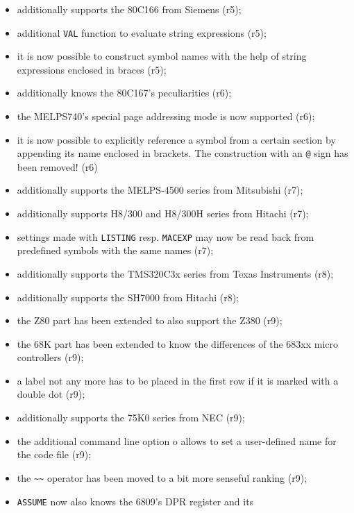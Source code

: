 \documentclass[12pt,twoside]{report}
\newcommand{\tty}[1]{{\tt #1}}
\begin{document}
\begin{itemize}
{\begin{itemize}
{            AS2MSG, replace it with the new version! (r5)}
      \item{additionally supports the 80C166 from Siemens (r5);}
      \item{additional \tty{VAL} function to evaluate string
            expressions (r5);}
      \item{it is now possible to construct symbol names with the
            help of string expressions enclosed in braces (r5);}
      \item{additionally knows the 80C167's peculiarities (r6);}
      \item{the MELPS740's special page addressing mode is now
            supported (r6);}
      \item{it is now possible to explicitly reference a symbol
            from a certain section by appending its name enclosed
            in brackets.  The construction with an \tty{@} sign has
            been removed! (r6)}
      \item{additionally supports the MELPS-4500 series from
            Mitsubishi (r7);}
      \item{additionally supports H8/300 and H8/300H series from
            Hitachi (r7);}
      \item{settings made with \tty{LISTING} resp. \tty{MACEXP} may now be
            read back from predefined symbols with the same names
            (r7);}
      \item{additionally supports the TMS320C3x series from Texas
            Instruments (r8);}
      \item{additionally supports the SH7000 from Hitachi (r8);}
      \item{the Z80 part has been extended to also support the
            Z380 (r9);}
      \item{the 68K part has been extended to know the
            differences of the 683xx micro controllers (r9);}
      \item{a label not any more has to be placed in the first
            row if it is marked with a double dot (r9);}
      \item{additionally supports the 75K0 series from NEC (r9);}
      \item{the additional command line option o allows to set
            a user-defined name for the code file (r9);}
      \item{the \verb!~~! operator has been moved to a bit more senseful
            ranking (r9);}
      \item{\tty{ASSUME} now also knows the 6809's DPR register and its
}
\end{itemize}}
\end{itemize}
\end{document}
